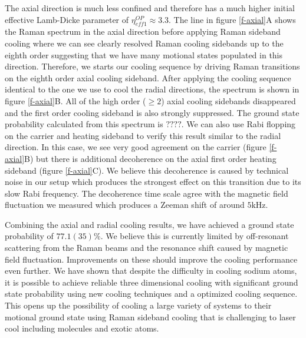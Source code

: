\documentclass[aps,prl,twocolumn,groupedaddress]{revtex4-1}
\begin{document}
The axial direction is much less confined and therefore has a much higher initial effective
Lamb-Dicke parameter of $\eta^{OP}_{eff1}\approx3.3$.
The line in figure \ref{f-axial}A shows the Raman spectrum in the axial direction
before applying Raman sideband cooling where we can see clearly resolved Raman cooling sidebands
up to the eighth order suggesting that we have many motional states populated in this direction.
Therefore, we starts our cooling sequence by driving Raman transitions on the eighth order axial
cooling sideband. After applying the cooling sequence identical to the one we use to cool
the radial directions, the spectrum is shown in figure \ref{f-axial}B.
All of the high order ($\geqslant2$) axial cooling sidebands disappeared and the first order
cooling sideband is also strongly suppressed.
The ground state probability calculated from this spectrum is $????$.
We can also use Rabi flopping on the carrier and heating sideband to verify this result
similar to the radial direction. In this case, we see very good agreement on the carrier
(figure \ref{f-axial}B) but there is additional decoherence on the axial first order
heating sideband (figure \ref{f-axial}C).
We believe this decoherence is caused by technical noise in our setup which
produces the strongest effect on this transition due to its slow Rabi frequency.
The decoherence time scale agree with the magnetic field fluctuation we measured which produces
a Zeeman shift of around $5\text{kHz}$.

Combining the axial and radial cooling results,
we have achieved a ground state probability of $77.1(35)\%$.
We believe this is currently limited by off-resonant scattering from the Raman beams
and the resonance shift caused by magnetic field fluctuation.
Improvements on these should improve the cooling performance even further.
We have shown that despite the difficulty in cooling sodium atoms,
it is possible to achieve reliable three dimensional cooling with significant ground state
probability using new cooling techniques and a optimized cooling sequence.
This opens up the possibility of cooling a large variety of systems to their motional ground
state using Raman sideband cooling that is challenging to laser cool
including molecules and exotic atoms.



\end{document}
